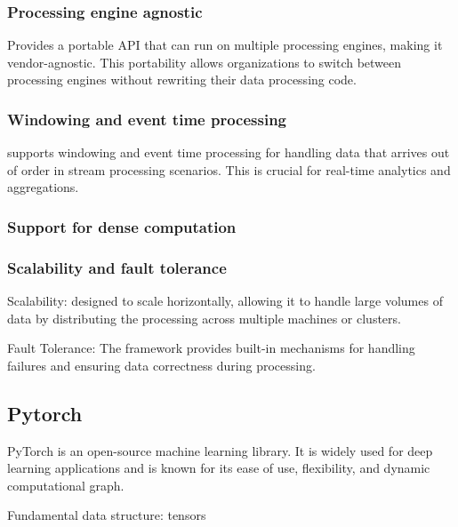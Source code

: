 \documentclass[11pt, reqno]{amsart}
\theoremstyle{definition}
\theoremstyle{remark}
\begin{document}
\subsubsection{Processing engine agnostic}
Provides a portable API that can run on
multiple processing engines, making it vendor-agnostic. This portability allows
organizations to switch between processing engines without rewriting their data
processing code.

\subsubsection{Windowing and event time processing}
supports windowing and event time processing for handling data that arrives out
of order in stream processing scenarios. This is crucial for real-time
analytics and aggregations.

\subsubsection{Support for dense computation}

\subsubsection{Scalability and fault tolerance}
Scalability: designed to scale horizontally, allowing it to handle
large volumes of data by distributing the processing across multiple machines
or clusters.

Fault Tolerance: The framework provides built-in mechanisms for handling
failures and ensuring data correctness during processing.

\subsection{Pytorch}
PyTorch is an open-source machine learning library. It is widely used for deep
learning applications and is known for its ease of use, flexibility, and
dynamic computational graph.

Fundamental data structure: tensors
\end{document}
